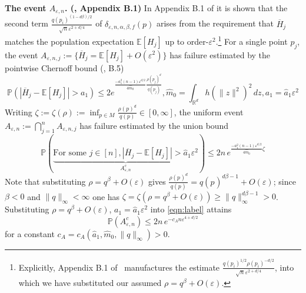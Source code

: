 \documentclass{article}
\let\todo\undefined
\let\todo\undefined
\newcommand{\todo}[1][]{}
\theoremstyle{remark}
\theoremstyle{plain}
\begin{document}
{\textbf{The event $A_{\varepsilon,n}$. (\cite{Berry2016}, Appendix B.1)}}  In Appendix B.1 of \cite{Berry2016} it is shown that the second term $\frac{q(p_{i})^{(1- d \beta)/2}}{\sqrt{ n }\varepsilon^{2+ d/ 4}}$ of $\delta_{\varepsilon, n, \alpha, \beta, f}(p)$ arises from the requirement that $\overline{H}_{j}$ matches the population expectation $\mathbb{E}[H_{j}]$ up to order-$\varepsilon^{2}$.\footnote{Explicitly, Appendix B.1 of~\cite{Berry2016} manufactures the estimate \( \frac{q(p_{i})^{1/2} \rho(p_{i})^{-d/2}}{\sqrt{n} \varepsilon ^{2+d/4}} \), into which we have substituted our assumed $\rho=q^{\beta}+O(\varepsilon)$.} For a single point $p_{j}$, the event $A_{\varepsilon, n , j}:=\{ \overline{H}_{j}= \mathbb{E}[H_{j}]+O(\varepsilon^{2}) \}$ has failure estimated by the pointwise Chernoff bound (\cite{Berry2016}, B.5)
\begin{equation}
\mathbb{P}( |\overline{H}_{j}- \mathbb{E}[H_{j}]|> a_{1} )\leq  2 e ^{\frac{- {a}_{1}^{2}(n-1)\varepsilon^{d/2}}{4 \hat{m}_{0} } \frac{\rho(p_{j})^{d}}{q(p_{j})} }, \hat{m}_{0}=\int_{\mathbb{R}^{d}}h(\|z\|^{2})^{2} \, dz, a_{1}=\hat{a}_{1}\varepsilon^{2}
\end{equation}
Writing $\zeta:=\zeta(\rho):=\inf_{p \in M} \frac{\rho(p)^{d}}{q(p)} \in [0, \infty]$, the uniform event $A_{\varepsilon, n}:= \bigcap_{j=1}^{n}A_{\varepsilon, n ,j}$ has failure estimated by the union bound
\begin{equation}
\mathbb{P}(\underbrace{ \text{For some }j \in [n], |\overline{H}_{j}- \mathbb{E}[H_{j}]|>\hat{a}_{1} \varepsilon^{2} }_{ A_{\varepsilon, n}^{c} }) \leq  2n\, e ^{\frac{- {a}_{1}^{2}(n-1)\varepsilon^{d/2}}{4 \hat{m}_{0} } \zeta }
\label{eqn:label}
\end{equation}
Note that substituting $\rho=q^{\beta}+O(\varepsilon)$ gives $\frac{\rho(p_{})^{d}}{q(p_{})}=q(p_{})^{d \beta -1}+O(\varepsilon)$; since $\beta<0$ and $\|q\|_{\infty}<\infty$ one has $\zeta=\zeta(\rho=q^{\beta}+O(\varepsilon)) \geq \|q\|_{\infty}^{d \beta - 1} >0$. Substituting $\rho=q^{\beta}+O(\varepsilon)$, $a_{1}=\hat{a}_{1}\varepsilon^{2}$ into \eqref{eqn:label} attains
\begin{equation}
\mathbb{P} (A_{\varepsilon, n}^{c}) \leq 2n \, e^{- c_{A}n \varepsilon^{4+ d/ 2}}
\end{equation}
for a constant $c_{A}=c_{A}(\hat{a}_{1}, \hat{m}_{0},  \|q\|_{\infty})>0$.

\end{document}
